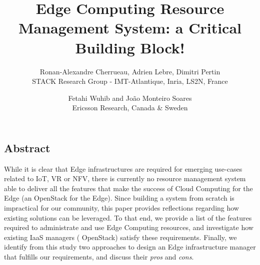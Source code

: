 \documentclass[letterpaper,twocolumn,10pt]{article}
\begin{document}
\date{}

\title{\Large Edge Computing Resource Management System: a Critical Building Block!}

\author{
{\rm Ronan-Alexandre Cherrueau, Adrien Lebre, Dimitri Pertin}\\
STACK Research Group - IMT-Atlantique, Inria, LS2N, France
\and
{\rm Fetahi Wuhib and  João Monteiro Soares}\\
Ericsson Research, Canada \& Sweden\\
} %

\maketitle

\thispagestyle{empty}


\subsection*{Abstract}
While it is clear that Edge infrastructures are required for emerging
use-cases related to IoT, VR or NFV, there is currently no resource management
system able to deliver all the features that make the success of
Cloud Computing for the Edge (\eg an OpenStack for the Edge).
%
Since building a system from scratch is impractical for our community,
this paper provides reflections regarding
how existing solutions can be leveraged.
%
To that end, we provide a list of the features required to administrate and use
Edge Computing resources, and investigate how existing IaaS managers (\ie
OpenStack) satisfy these requirements. Finally, we identify from this study two
approaches to design an Edge infrastructure manager that fulfills our
requirements, and discuss their \emph{pros} and \emph{cons}.






% 
% 




{\footnotesize
}

\theendnotes
\end{document}
